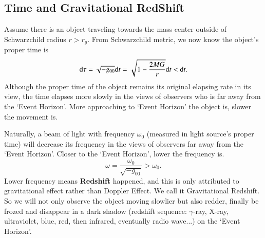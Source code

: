 \documentclass[openany,10pt]{book}
\theoremstyle{definition}
\theoremstyle{definition}
\theoremstyle{remark}
\begin{document}
\hrulefill




\subsection{Time and Gravitational RedShift}\label{Schwred}
Assume there is an object traveling towards the mass center outside of Schwarzchild radius $r>r_g$. From Schwarzchild metric, we now know the object's proper time is
\begin{equation}
    {\rm d}\tau=\sqrt{-g_{00}}{\rm d}t=\sqrt{1-\frac{2MG}{r}}{\rm d}t<{\rm d}t.
\end{equation} 
Although the proper time of the object remains its original elapsing rate in its view, the time elapses more slowly in the views of observers who is far away from the `Event Horizon'.  More approaching to `Event Horizon' the object is,   slower the movement is.

\hrulefill


\hrulefill

Naturally, a beam of light with frequency $\omega_0$ (measured in light source's proper time) will decrease its frequency in the views of observers far away from the `Event Horizon'.   Closer to the `Event Horizon', lower the frequency is.
\begin{equation}
    \omega=\frac{ \omega_0}{\sqrt{-g_{00}}}> \omega_0.
\end{equation}
Lower frequency means {\bfseries Redshift} happened, and this is only attributed to gravitational effect rather than Doppler Effect. We call it Gravitational Redshift. So we will not only observe the object moving slowlier but also redder, finally be frozed and disappear in a dark shadow (redshift sequence: $\gamma$-ray, X-ray, ultraviolet, blue, red, then infrared, eventually radio wave...) on the `Event Horizon'. 
\end{document}
